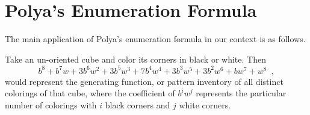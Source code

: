 \section{Polya's Enumeration Formula}

The main application of Polya's enumeration formula in our context is as follows.

\begin{example} \cite[??]{Tucker1974} Take an un-oriented cube and color its corners in black or white. Then
$$
b^8 + b^7w + 3b^6w^2 + 3b^5w^3 + 7b^4w^4 + 3b^3w^5 + 3b^2w^6 + bw^7 + w^8 \enspace,
$$
would represent the generating function, or pattern inventory of all distinct colorings of that cube, where the coefficient of $b^iw^j$ represents the particular number of colorings with $i$ black corners and $j$ white corners.
\end{example}
